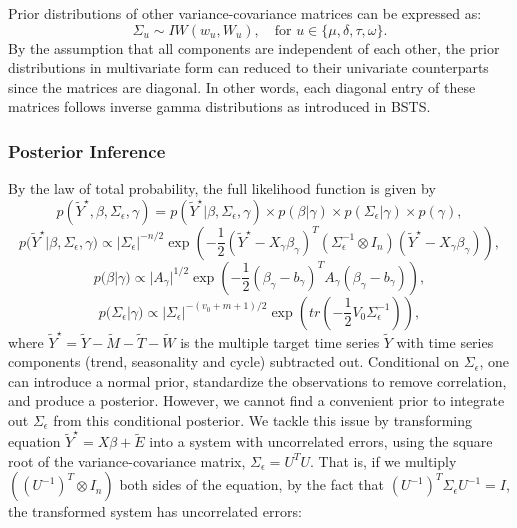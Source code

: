\documentclass[twoside,11pt]{article}
\begin{document}
Prior distributions of other variance-covariance matrices can be expressed as:
\begin{equation} \label{eq:15}
\Sigma_u\sim IW(w_u,W_u), \quad\text{for } u\in \{\mu,\delta,\tau,\omega\}.
\end{equation}
By the assumption that all components are independent of each other,  the prior distributions in multivariate form can reduced to their univariate counterparts since the matrices are diagonal. In other words, each diagonal entry of these matrices follows inverse gamma distributions as introduced in BSTS.

\subsubsection{Posterior Inference}
By the law of total probability, the full likelihood function is given by
\begin{equation} \label{eq:liklihood}
p(\tilde{Y}^\star,\beta,\Sigma_\epsilon,\gamma)=p(\tilde{Y}^\star|\beta,\Sigma_\epsilon,\gamma)\times p(\beta|\gamma)\times p(\Sigma_\epsilon|\gamma)\times p(\gamma),
\end{equation}
\begin{equation} \label{eq:y}
p(\tilde{Y}^\star|\beta,\Sigma_\epsilon,\gamma)\propto |\Sigma_\epsilon|^{-n/2} \exp\left({-\frac{1}{2}(\tilde{Y}^\star-X_\gamma \beta_\gamma)^T(\Sigma_\epsilon^{-1}\otimes I_n)(\tilde{Y}^\star-X_\gamma \beta_\gamma)}\right),
\end{equation}
\begin{equation} \label{eq:beta}
p(\beta|\gamma)\propto |A_\gamma|^{1/2}\exp\left(-\frac{1}{2}(\beta_\gamma-b_\gamma)^T A_\gamma(\beta_\gamma-b_\gamma)\right),
\end{equation}
\begin{equation} \label{eq:sigma}
p(\Sigma_\epsilon|\gamma) \propto |\Sigma_\epsilon|^{-(v_0+m+1)/2}\exp\left(tr(-\frac{1}{2}V_0\Sigma_\epsilon^{-1})\right),
\end{equation}
where $\tilde{Y}^\star=\tilde{Y}-\tilde{M}-\tilde{T}-\tilde{W}$ is the multiple target time series $\tilde{Y}$ with time series components (trend, seasonality and cycle) subtracted out.
Conditional on $\Sigma_\epsilon$, one can introduce a normal prior, standardize the observations to remove correlation, and produce a posterior. However, we cannot find a convenient prior to integrate out $\Sigma_\epsilon$ from this conditional posterior. We tackle this issue by transforming equation $\tilde{Y}^\star=X\beta+\tilde{E}$ into a system with uncorrelated errors, using the square root of the variance-covariance matrix, $\Sigma_\epsilon=U^TU$. That is, if we multiply $((U^{-1})^T\otimes I_n)$ both sides of the equation, by the fact that $(U^{-1})^T\Sigma_\epsilon U^{-1}=I$, the transformed system has uncorrelated errors:
\end{document}
